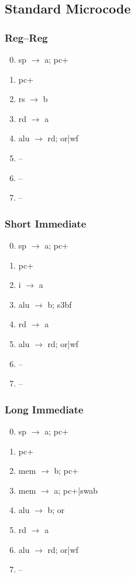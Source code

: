 \documentclass[11pt]{book}
\begin{document}
\subsection*{Standard Microcode}
\begin{multicols}{3}\ttfamily\selectfont\small
  \subsubsection*{Reg--Reg}
  \begin{enumerate}\setcounter{enumi}{-1}
  \item sp \(\rightarrow\) a; pc+
  \item pc+
  \item rs \(\rightarrow\) b
  \item rd \(\rightarrow\) a
  \item alu \(\rightarrow\) rd; or|wf
  \item --
  \item --
  \item --
  \end{enumerate}
  \columnbreak
  \subsubsection*{Short Immediate}
  \begin{enumerate}\setcounter{enumi}{-1}
  \item sp \(\rightarrow\) a; pc+
  \item pc+
  \item i \(\rightarrow\) a
  \item alu \(\rightarrow\) b; s3bf
  \item rd \(\rightarrow\) a
  \item alu \(\rightarrow\) rd; or|wf
  \item --
  \item --
  \end{enumerate}
  \columnbreak
  \subsubsection*{Long Immediate}
  \begin{enumerate}\setcounter{enumi}{-1}
  \item sp \(\rightarrow\) a; pc+
  \item pc+
  \item mem \(\rightarrow\) b; pc+
  \item mem \(\rightarrow\) a; pc+|swab
  \item alu \(\rightarrow\) b; or
  \item rd \(\rightarrow\) a
  \item alu \(\rightarrow\) rd; or|wf
  \item --
  \end{enumerate}
\end{multicols}
\end{document}
